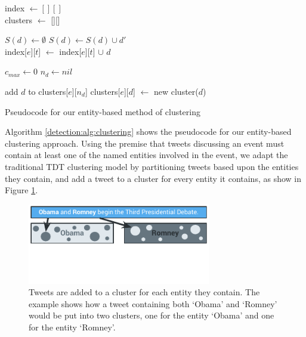 \begin{algorithm}[t]
	\DontPrintSemicolon
	index $\gets [][]$ \\
	clusters $\gets$ [][] \\

	 {

		 {

			$S(d) \gets \emptyset$ 
			 {
				 {
					$S(d) \gets S(d) \cup d'$ \\
				}
				index[$e$][$t$] $\gets$ index[$e$][$t$] $\cup$ $d$ \\
			}

			$c_{max} \gets 0$ 
			$n_{d} \gets nil$ 

			 {
				add $d$ to clusters[$e$][$n_d$]
			}{
				clusters[$e$][$d$] $\gets$ new cluster($d$)
			}

		}
	}

\caption{Pseudocode for our entity-based method of clustering}
\label{detection:alg:clustering}
\end{algorithm}

Algorithm \ref{detection:alg:clustering} shows the pseudocode for our entity-based clustering approach.
Using the premise that tweets discussing an event must contain at least one of the named entities involved in the event, we adapt the traditional TDT clustering model by partitioning tweets based upon the entities they contain, and add a tweet to a cluster for every entity it contains, as show in Figure \ref{detection:graphic:clustering}.

\begin{figure}[h!]
	\centering
	\includegraphics[width=8cm,trim=0cm 1.5cm 0cm 0cm]{Chapters/EntityDetection/images/clustering.pdf}
	\caption[How tweets are clustered based on the entities the contain]{Tweets are added to a cluster for each entity they contain. The example shows how a tweet containing both `Obama' and `Romney' would be put into two clusters, one for the entity `Obama' and one for the entity `Romney'.}
	\label{detection:graphic:clustering}
\end{figure}

